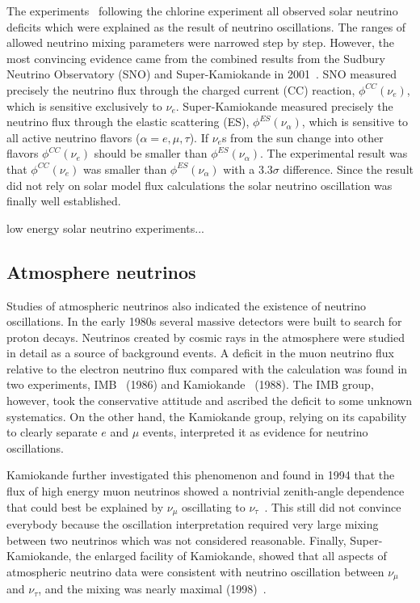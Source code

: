 The experiments~\cite{Hir89,Aba91,Ans92} following the chlorine experiment all observed solar neutrino deficits which were explained as the result of neutrino oscillations. The ranges of allowed neutrino mixing parameters were narrowed step by step. However, the most convincing evidence came from the combined results from the Sudbury Neutrino Observatory (SNO) and Super-Kamiokande in 2001~\cite{Ahm01,Fuk01}. SNO measured precisely the neutrino flux through the charged current (CC) reaction, $\phi^{CC}(\nu_e)$, which is sensitive exclusively to $\nu_e$. Super-Kamiokande measured precisely the neutrino flux through the elastic scattering (ES), $\phi^{ES}(\nu_\alpha)$, which is sensitive to all active neutrino flavors ($\alpha = e, \mu, \tau$). If $\nu_e$s from the sun change into other flavors $\phi^{CC}(\nu_e)$ should be smaller than $\phi^{ES}(\nu_\alpha)$. The experimental result was that $\phi^{CC}(\nu_e)$ was smaller than $\phi^{ES}(\nu_\alpha)$ with a $3.3\sigma$ difference. Since the result did not rely on solar model flux calculations the solar neutrino oscillation was finally well established.

low energy solar neutrino experiments...

\subsection{Atmosphere neutrinos}
\label{sec:atmo}
Studies of atmospheric neutrinos also indicated the existence of neutrino oscillations. In the early 1980s several massive detectors were built to search for proton decays. Neutrinos created by cosmic rays in the atmosphere were studied in detail as a source of background events. A deficit in the muon neutrino flux relative to the electron neutrino flux compared with the calculation was found in two experiments, IMB~\cite{Hai86} (1986) and Kamiokande~\cite{Hir88} (1988). The IMB group, however, took the conservative attitude and ascribed the deficit to some unknown systematics. On the other hand, the Kamiokande group, relying on its capability to clearly separate $e$ and $\mu$ events, interpreted it as evidence for neutrino oscillations.

Kamiokande further investigated this phenomenon and found in 1994 that the flux of high energy muon neutrinos showed a nontrivial zenith-angle dependence that could best be explained by $\nu_\mu$ oscillating to $\nu_\tau$~\cite{Fuk94}. This still did not convince everybody because the oscillation interpretation required very large mixing between two neutrinos which was not considered reasonable. Finally, Super-Kamiokande, the enlarged facility of Kamiokande, showed that all aspects of atmospheric neutrino data were consistent with neutrino oscillation between $\nu_\mu$ and $\nu_\tau$, and the mixing was nearly maximal (1998)~\cite{Fuk98}.

